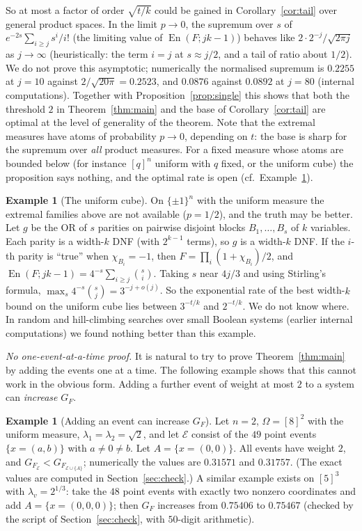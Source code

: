\documentclass[11pt,reqno]{amsart}
\theoremstyle{definition}
\newtheorem{example}[theorem]{Example}
\newcommand{\energy}{\operatorname{En}}
\newcommand{\cE}{\mathcal E}
\begin{document}
So at most a factor of order $\sqrt{t/k}$ could be gained in
Corollary~\ref{cor:tail} over general product spaces.  In the limit $p\to0$,
the supremum over $s$ of $e^{-2s}\sum_{i\ge j}s^i/i!$ (the limiting value of
$\energy(F;jk-1)$) behaves like $2\cdot2^{-j}/\sqrt{2\pi j}$ as $j\to\infty$ (heuristically: the
term $i=j$ at $s\approx j/2$, and a tail of ratio about $1/2$).  We do not prove this
asymptotic; numerically the normalised supremum is $0.2255$ at $j=10$ against
$2/\sqrt{20\pi}=0.2523$, and $0.0876$ against $0.0892$ at $j=80$ (internal
computations).  Together with Proposition~\ref{prop:single} this shows that both
the threshold $2$ in Theorem~\ref{thm:main} and the base of
Corollary~\ref{cor:tail} are optimal at the level of generality of the
theorem.  Note that the extremal measures have atoms of probability $p\to0$,
depending on $t$: the base is sharp for the supremum over \emph{all} product
measures.  For a fixed measure whose atoms are bounded below (for instance
$[q]^n$ uniform with $q$ fixed, or the uniform cube) the proposition says
nothing, and the optimal rate is open (cf.\ Example~\ref{ex:parity}).

\begin{example}[The uniform cube]\label{ex:parity}
On $\{\pm1\}^n$ with the uniform measure the extremal families above are not
available ($p=1/2$), and the truth may be better.  Let $g$ be the OR of $s$
parities on pairwise disjoint blocks $B_1,\dots,B_s$ of $k$ variables.  Each parity
is a width-$k$ DNF (with $2^{k-1}$ terms), so $g$ is a width-$k$ DNF.  If the
$i$-th parity is ``true'' when $\chi_{B_i}=-1$, then $F=\prod_i(1+\chi_{B_i})/2$, and
$\energy(F;jk-1)=4^{-s}\sum_{i\ge j}\binom si$.  Taking $s$ near $4j/3$ and using
Stirling's formula, $\max_s4^{-s}\binom sj=3^{-j+o(j)}$.  So the exponential rate of
the best width-$k$ bound on the uniform cube lies between $3^{-t/k}$ and
$2^{-t/k}$.  We do not know where.  In random and hill-climbing searches over
small Boolean systems (earlier internal computations) we found nothing
better than this example.
\end{example}

\emph{No one-event-at-a-time proof.}  It is natural to try to prove
Theorem~\ref{thm:main} by adding the events one at a time.  The following
example shows that this cannot work in the obvious form.  Adding a further
event of weight at most $2$ to a system can \emph{increase} $G_F$.

\begin{example}[Adding an event can increase $G_F$]\label{ex:mono}
Let $n=2$, $\Omega=[8]^2$ with the uniform measure, $\lambda_1=\lambda_2=\sqrt2$, and let
$\cE$ consist of the $49$ point events $\{x=(a,b)\}$ with $a\ne0\ne b$.  Let
$A=\{x=(0,0)\}$.  All events have weight $2$, and
$G_{F_\cE}<G_{F_{\cE\cup\{A\}}}$; numerically the values are $0.31571$ and
$0.31757$.  (The exact values are computed in Section~\ref{sec:check}.)  A
similar example exists on $[5]^3$ with $\lambda_v=2^{1/3}$: take the $48$ point events
with exactly two nonzero coordinates and add $A=\{x=(0,0,0)\}$; then $G_F$
increases from $0.75406$ to $0.75467$ (checked by the script of
Section~\ref{sec:check}, with $50$-digit arithmetic).
\end{example}
\end{document}

